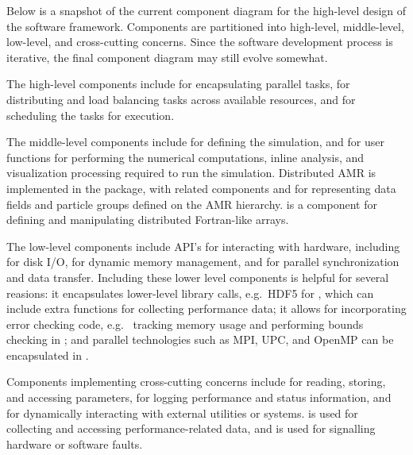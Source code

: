 \documentclass[10pt,twocolumn]{article}
\begin{document}
Below is a snapshot of the current component diagram for the
high-level design of the software framework.  Components are
partitioned into high-level, middle-level, low-level, and
cross-cutting concerns.  Since the software development process is
iterative, the final component diagram may still evolve somewhat.



The high-level components include  for encapsulating
parallel tasks,  for distributing and load balancing
tasks across available resources, and  for scheduling
the tasks for execution.

The middle-level components include  for defining the
simulation, and  for user functions for
performing the numerical computations, inline analysis, and
visualization processing required to run the simulation.  Distributed
AMR is implemented in the  package, with related components
 and  for representing data fields and
particle groups defined on the AMR hierarchy.   is a
component for defining and manipulating distributed Fortran-like
arrays.

The low-level components include API's for interacting with hardware,
including  for disk I/O,  for dynamic memory
management, and  for parallel synchronization and data
transfer.  Including these lower level components is helpful for
several reasions: it encapsulates lower-level library calls, e.g.~HDF5
for , which can include extra functions for collecting
performance data; it allows for incorporating error checking code,
e.g.~ tracking memory usage and performing bounds checking in
; and parallel technologies such as MPI, UPC, and OpenMP
can be encapsulated in .

Components implementing cross-cutting concerns include
 for reading, storing, and accessing parameters,
 for logging performance and status information, and
 for dynamically interacting with external utilities or
systems.   is used for collecting and accessing
performance-related data, and  is used for signalling
hardware or software faults.
\end{document}
